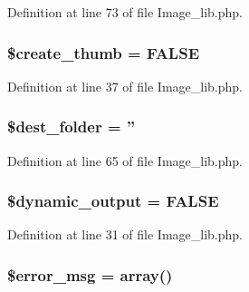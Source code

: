 Definition at line 73 of file Image\-\_\-lib.\-php.

\hypertarget{class_c_i___image__lib_ab1250903cbadaaadb42ec188d38ab398}{
\subsubsection[{\$create\-\_\-thumb}]{\setlength{\rightskip}{0pt plus 5cm}\$create\-\_\-thumb = F\-A\-L\-S\-E}}\label{class_c_i___image__lib_ab1250903cbadaaadb42ec188d38ab398}


Definition at line 37 of file Image\-\_\-lib.\-php.

\hypertarget{class_c_i___image__lib_a23c580d10b1ba89c5b532f43fe2c6f59}{
\subsubsection[{\$dest\-\_\-folder}]{\setlength{\rightskip}{0pt plus 5cm}\$dest\-\_\-folder = ''}}\label{class_c_i___image__lib_a23c580d10b1ba89c5b532f43fe2c6f59}


Definition at line 65 of file Image\-\_\-lib.\-php.

\hypertarget{class_c_i___image__lib_ad90737913d82776e7d3a7dfaef68e167}{
\subsubsection[{\$dynamic\-\_\-output}]{\setlength{\rightskip}{0pt plus 5cm}\$dynamic\-\_\-output = F\-A\-L\-S\-E}}\label{class_c_i___image__lib_ad90737913d82776e7d3a7dfaef68e167}


Definition at line 31 of file Image\-\_\-lib.\-php.

\hypertarget{class_c_i___image__lib_acf910733622c1fa671b9f755c69c2ec7}{
\subsubsection[{\$error\-\_\-msg}]{\setlength{\rightskip}{0pt plus 5cm}\$error\-\_\-msg = array()}}\label{class_c_i___image__lib_acf910733622c1fa671b9f755c69c2ec7}


